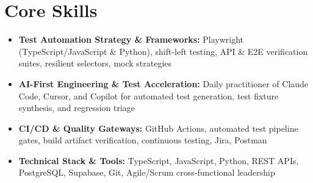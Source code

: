 \documentclass[a4paper,10pt]{article}
\begin{document}
\section{Core Skills}
\begin{itemize}
 \item \textbf{Test Automation Strategy \& Frameworks:} Playwright (TypeScript/JavaScript \& Python), shift-left testing, API \& E2E verification suites, resilient selectors, mock strategies
 \item \textbf{AI-First Engineering \& Test Acceleration:} Daily practitioner of Claude Code, Cursor, and Copilot for automated test generation, test fixture synthesis, and regression triage
 \item \textbf{CI/CD \& Quality Gateways:} GitHub Actions, automated test pipeline gates, build artifact verification, continuous testing, Jira, Postman
 \item \textbf{Technical Stack \& Tools:} TypeScript, JavaScript, Python, REST APIs, PostgreSQL, Supabase, Git, Agile/Scrum cross-functional leadership
\end{itemize}
\end{document}
